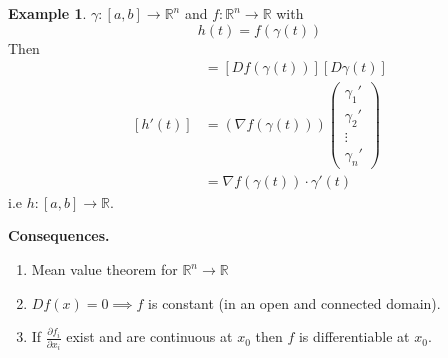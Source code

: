 \documentclass[11pt,a4paper]{article}
\theoremstyle{definition}
\newtheorem{example}[definition]{Example}
\theoremstyle{plain}
\theoremstyle{remark}
\newcommand{\R}{\mathbb{R}}
\begin{document}
\begin{example}
    $\gamma \colon [a,b] \to \R^n$ and $f \colon \R^n \to \R$ with 
    $$h(t) = f(\gamma(t))$$
    Then 
    \begin{align*}
        [Dh(t)] &= [Df(\gamma(t))] [D\gamma(t)] \\
        [h'(t)] &= (\nabla f (\gamma(t))) \begin{pmatrix}
            \gamma_1' \\
            \gamma_2' \\
            \vdots \\
            \gamma_n'
        \end{pmatrix}  \\
        &= \nabla f(\gamma(t)) \cdot \gamma'(t)
    \end{align*} 
    i.e $h \colon [a,b] \to \R$. 
\end{example}

\textbf{Consequences.}
\begin{enumerate}
    \item Mean value theorem for $\R^n \to \R$
    \item $Df(x) = 0 \implies f$ is constant (in an open and connected domain). 
    \item If $\frac{\partial f_i}{\partial x_i}$ exist and are continuous at $x_0$ then $f$ is differentiable at $x_0$.
\end{enumerate}
\end{document}
